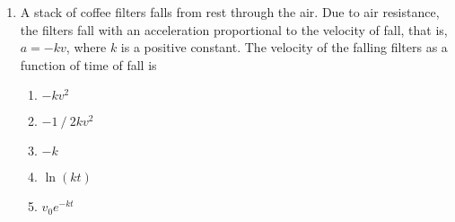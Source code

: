 \documentclass{../../oss-apphys}
\begin{document}
\begin{multicols}{2}
\begin{enumerate}[leftmargin=18pt]

    \begin{enumerate}[noitemsep,topsep=0pt,leftmargin=18pt,label=(\Alph*)]
    \item\SI{2}{\second}
    \item\SI{4}{\second}
    \item\SI{6}{\second}
    \item\SI{9}{\second}
    \item\SI{10}{\second}
    \end{enumerate}

  \item A stack of coffee filters falls from rest through the air. Due to air
    resistance, the filters fall with an acceleration proportional to the
    velocity of fall, that is, $a=-kv$, where $k$ is a positive constant. The
    velocity of the falling filters as a function of time of fall is
    \begin{enumerate}[noitemsep,topsep=0pt,leftmargin=18pt,label=(\Alph*)]
    \item $-kv^2$
    \item $-1⁄2kv^2$
    \item $-k$
    \item $\ln(kt)$
    \item $v_0e^{-kt}$
    \end{enumerate}
    
    \columnbreak
    
%    
%
  \end{enumerate}
  

\end{multicols}
\end{document}
